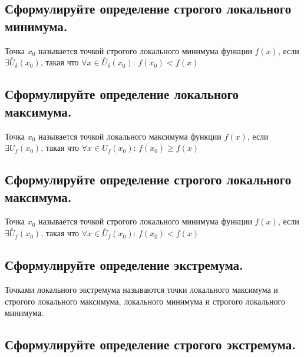 

\subsection{Сформулируйте определение строгого локального минимума.}

Точка $x_0$ называется точкой строгого локального минимума функции $f(x)$, если $\exists \overset{\circ}{U}_{\delta}(x_0)$, такая что $\forall x \in \overset{\circ}{U}_{\delta}(x_0)$: $f(x_0) < f(x)$



\subsection{Сформулируйте определение локального максимума.}

Точка $x_0$ называется точкой локального максимума функции $f(x)$, если $\exists U_f(x_0)$, такая что $\forall x \in U_f(x_0)$: $f(x_0) \geqslant f(x)$



\subsection{Сформулируйте определение строгого локального максимума.}

Точка $x_0$ называется точкой строгого локального минимума функции $f(x)$, если $\exists \overset{\circ}{U}_f(x_0)$, такая что $\forall x \in \overset{\circ}{U}_f(x_0)$: $f(x_0) < f(x)$



\subsection{Сформулируйте определение экстремума.}

Точками локального экстремума называются точки локального максимума и строгого локального максимума, локального минимума и строгого локального минимума.



\subsection{Сформулируйте определение строгого экстремума.}

